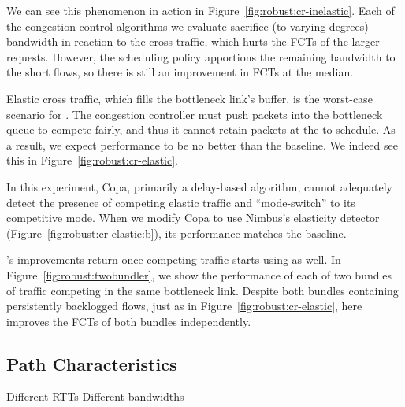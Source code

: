We can see this phenomenon in action in Figure~\ref{fig:robust:cr-inelastic}. 
Each of the congestion control algorithms we evaluate sacrifice (to varying degrees) bandwidth in reaction to the cross traffic, which hurts the FCTs of the larger requests.
However, the scheduling policy apportions the remaining bandwidth to the short flows, so there is still an improvement in FCTs at the median.



 Elastic cross traffic, which fills the bottleneck link's buffer, is the worst-case scenario for \name.
The congestion controller must push packets into the bottleneck queue to compete fairly, and thus it cannot retain packets at the \inbox to schedule.
As a result, we expect performance to be no better than the baseline.
We indeed see this in Figure~\ref{fig:robust:cr-elastic}.

In this experiment, Copa, primarily a delay-based algorithm, cannot adequately detect the presence of competing elastic traffic and ``mode-switch'' to its competitive mode. When we modify Copa to use Nimbus's elasticity detector (Figure~\ref{fig:robust:cr-elastic:b}), its performance matches the baseline.



 \name's improvements return once competing traffic starts using \name as well. In Figure~\ref{fig:robust:twobundler}, we show the performance of each of two bundles of traffic competing in the same bottleneck link. 
Despite both bundles containing persistently backlogged flows, just as in Figure~\ref{fig:robust:cr-elastic}, here \name improves the FCTs of both bundles independently.

\subsection{Path Characteristics}\label{s:robust:path}
 
\begin{outline}
\1 Different RTTs
\1 Different bandwidths
\end{outline}
